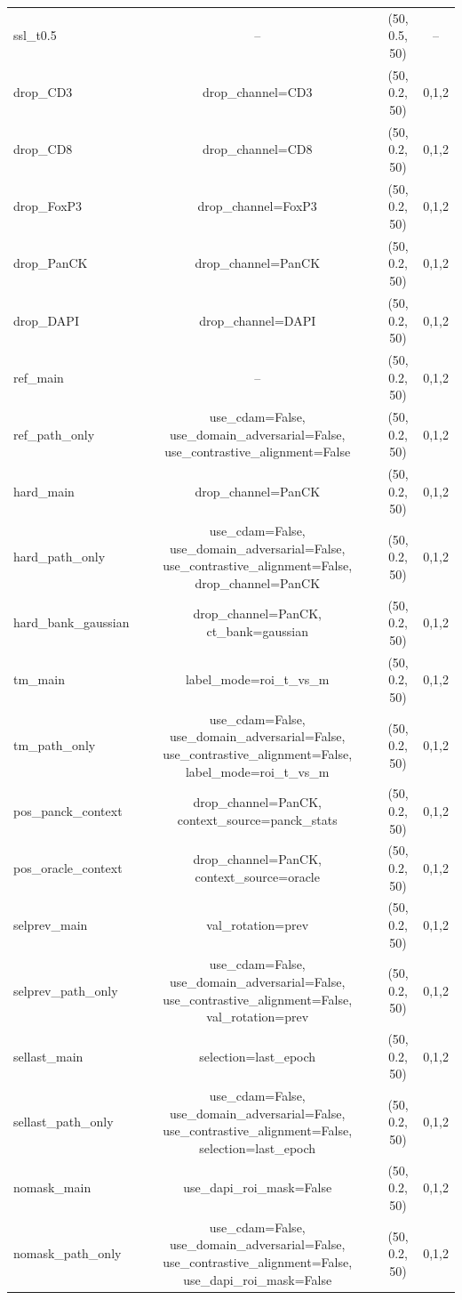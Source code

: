 \begin{table}[t]
{\begin{tabular}{@{}lccc@{}}
ssl\_t0.5 & -- & (50, 0.5, 50) & -- \\
drop\_CD3 & drop\_channel=CD3 & (50, 0.2, 50) & 0,1,2 \\
drop\_CD8 & drop\_channel=CD8 & (50, 0.2, 50) & 0,1,2 \\
drop\_FoxP3 & drop\_channel=FoxP3 & (50, 0.2, 50) & 0,1,2 \\
drop\_PanCK & drop\_channel=PanCK & (50, 0.2, 50) & 0,1,2 \\
drop\_DAPI & drop\_channel=DAPI & (50, 0.2, 50) & 0,1,2 \\
ref\_main & -- & (50, 0.2, 50) & 0,1,2 \\
ref\_path\_only & use\_cdam=False, use\_domain\_adversarial=False, use\_contrastive\_alignment=False & (50, 0.2, 50) & 0,1,2 \\
hard\_main & drop\_channel=PanCK & (50, 0.2, 50) & 0,1,2 \\
hard\_path\_only & use\_cdam=False, use\_domain\_adversarial=False, use\_contrastive\_alignment=False, drop\_channel=PanCK & (50, 0.2, 50) & 0,1,2 \\
hard\_bank\_gaussian & drop\_channel=PanCK, ct\_bank=gaussian & (50, 0.2, 50) & 0,1,2 \\
tm\_main & label\_mode=roi\_t\_vs\_m & (50, 0.2, 50) & 0,1,2 \\
tm\_path\_only & use\_cdam=False, use\_domain\_adversarial=False, use\_contrastive\_alignment=False, label\_mode=roi\_t\_vs\_m & (50, 0.2, 50) & 0,1,2 \\
pos\_panck\_context & drop\_channel=PanCK, context\_source=panck\_stats & (50, 0.2, 50) & 0,1,2 \\
pos\_oracle\_context & drop\_channel=PanCK, context\_source=oracle & (50, 0.2, 50) & 0,1,2 \\
selprev\_main & val\_rotation=prev & (50, 0.2, 50) & 0,1,2 \\
selprev\_path\_only & use\_cdam=False, use\_domain\_adversarial=False, use\_contrastive\_alignment=False, val\_rotation=prev & (50, 0.2, 50) & 0,1,2 \\
sellast\_main & selection=last\_epoch & (50, 0.2, 50) & 0,1,2 \\
sellast\_path\_only & use\_cdam=False, use\_domain\_adversarial=False, use\_contrastive\_alignment=False, selection=last\_epoch & (50, 0.2, 50) & 0,1,2 \\
nomask\_main & use\_dapi\_roi\_mask=False & (50, 0.2, 50) & 0,1,2 \\
nomask\_path\_only & use\_cdam=False, use\_domain\_adversarial=False, use\_contrastive\_alignment=False, use\_dapi\_roi\_mask=False & (50, 0.2, 50) & 0,1,2 \\

\end{tabular}}
\end{table}
